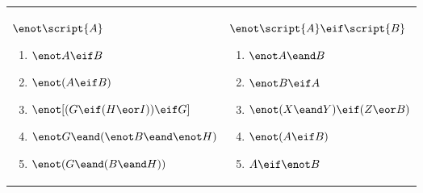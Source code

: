 \begin{exercises}
\begin{longtabu}{X[1,p,m]X[1,p,m]}
\\

\item $\enot \script{A}$
	\begin{enumerate}[label=\alph*.]
	\item $\enot A \eif B$
	\item $\enot (A \eif B)$
	\item $\enot[(G \eif (H \eor I)) \eif G]$
	\item $\enot G \eand (\enot B \eand \enot H)$
	\item $\enot(G \eand (B \eand H))$
	\end{enumerate}
&

\item $\enot \script{A} \eif  \script{B}$
	\begin{enumerate}[label=\alph*.]
	\item $\enot A \eand B$
	\item $\enot B \eif A$
	\item $\enot(X \eand Y) \eif (Z \eor B)$
	\item $\enot(A \eif B)$
	\item $A \eif \enot B$
	\end{enumerate}


\\


\end{longtabu}
\end{exercises}
